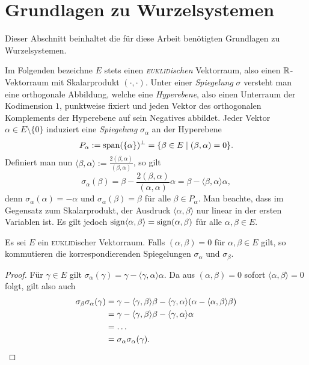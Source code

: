 \section{Grundlagen zu Wurzelsystemen}
\label{sec:grundlagen}

Dieser Abschnitt beinhaltet die für diese Arbeit benötigten Grundlagen zu Wurzelsystemen.

Im Folgenden bezeichne $E$ stets einen \emph{\textsc{euklid}ischen} Vektorraum, also einen $\mathbb{R}$\hyp{}Vektorraum mit Skalarprodukt $(\cdot,\cdot)$.
Unter einer \emph{Spiegelung} $\sigma$ versteht man eine orthogonale Abbildung, welche eine \emph{Hyperebene}, also einen Unterraum der Kodimension $1$, punktweise fixiert und jeden Vektor des orthogonalen Komplements der Hyperebene auf sein Negatives abbildet.
Jeder Vektor $\alpha \in E \setminus \{0\}$ induziert eine \emph{Spiegelung} $\sigma_\alpha$ an der Hyperebene 
\begin{displaymath}
  P_\alpha := \operatorname{span}(\{\alpha\})^\perp = \{\beta \in E \mid (\beta, \alpha) = 0\}.
\end{displaymath}
Definiert man nun $\langle \beta, \alpha \rangle := \tfrac{2 (\beta, \alpha)}{(\beta, \alpha)}$, so gilt
\begin{displaymath}
  \sigma_\alpha(\beta) 
  = \beta - \frac{2 (\beta, \alpha)}{(\alpha,\alpha)} \alpha 
  = \beta - \langle \beta, \alpha \rangle \alpha,
\end{displaymath}
denn $\sigma_\alpha(\alpha) = -\alpha$ und $\sigma_\alpha(\beta) = \beta$ für alle $\beta \in P_\alpha$.
Man beachte, dass im Gegensatz zum Skalarprodukt, der Ausdruck $\langle \alpha, \beta \rangle$ nur linear in der ersten Variablen ist.
Es gilt jedoch $\operatorname{sign} \langle \alpha, \beta \rangle = \operatorname{sign} (\alpha, \beta)$ für alle $\alpha, \beta \in E$.

\begin{lem}
  \label{lem:orthogonalRoots}
  Es sei $E$ ein \textsc{euklid}ischer Vektorraum.
  Falls $(\alpha, \beta) = 0$ für $\alpha, \beta \in E$ gilt, so kommutieren die korrespondierenden Spiegelungen $\sigma_\alpha$ und $\sigma_\beta$.
\end{lem}

\begin{proof}
  Für $\gamma \in E$ gilt $\sigma_\alpha(\gamma) = \gamma - \langle \gamma, \alpha \rangle \alpha$. Da aus $(\alpha, \beta) = 0$ sofort $\langle \alpha, \beta \rangle = 0$ folgt, gilt also auch
  \begin{align*}
    \sigma_\beta \sigma_\alpha(\gamma) 
    &= \gamma - \langle \gamma, \beta \rangle \beta - \langle \gamma, \alpha \rangle (\alpha - \langle \alpha, \beta \rangle \beta) \\
    &= \gamma - \langle \gamma, \beta \rangle \beta - \langle \gamma, \alpha \rangle \alpha \\
    &= \dots \\
    &= \sigma_\alpha \sigma_\alpha(\gamma).\qedhere
  \end{align*} 
\end{proof}

